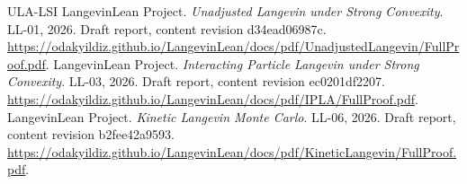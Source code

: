 \documentclass[11pt,a4paper]{article}
\begin{document}
\begin{thebibliography}{ULA-LSI}
LangevinLean Project. \emph{Unadjusted Langevin under Strong Convexity}. LL-01, 2026. Draft report, content revision d34ead06987c. \url{https://odakyildiz.github.io/LangevinLean/docs/pdf/UnadjustedLangevin/FullProof.pdf}.
LangevinLean Project. \emph{Interacting Particle Langevin under Strong Convexity}. LL-03, 2026. Draft report, content revision ec0201df2207. \url{https://odakyildiz.github.io/LangevinLean/docs/pdf/IPLA/FullProof.pdf}.
LangevinLean Project. \emph{Kinetic Langevin Monte Carlo}. LL-06, 2026. Draft report, content revision b2fee42a9593. \url{https://odakyildiz.github.io/LangevinLean/docs/pdf/KineticLangevin/FullProof.pdf}.
\end{thebibliography}
\end{document}
